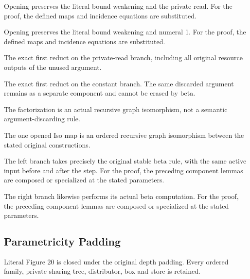 Opening preserves the literal bound weakening and the private read.
For the proof, the defined maps and incidence equations are substituted.
\par{}

Opening preserves the literal bound weakening and numeral 1.
For the proof, the defined maps and incidence equations are substituted.
\par{}

The exact first reduct on the private-read branch, including all original resource outputs of the unused argument.
\par{}

The exact first reduct on the constant branch. The same discarded argument remains as a separate component and cannot be erased by beta.
\par{}

The factorization is an actual recursive graph isomorphism, not a semantic argument-discarding rule.
\par{}

The one opened Iso map is an ordered recursive graph isomorphism between the stated original constructions.
\par{}

The left branch takes precisely the original stable beta rule, with the same active input before and after the step.
For the proof, the preceding component lemmas are composed or specialized at the stated parameters.
\par{}

The right branch likewise performs its actual beta computation.
For the proof, the preceding component lemmas are composed or specialized at the stated parameters.
\par{}

\subsection{Parametricity Padding}
Literal Figure 20 is closed under the original depth padding. Every ordered family, private sharing tree, distributor, box and store is retained.


